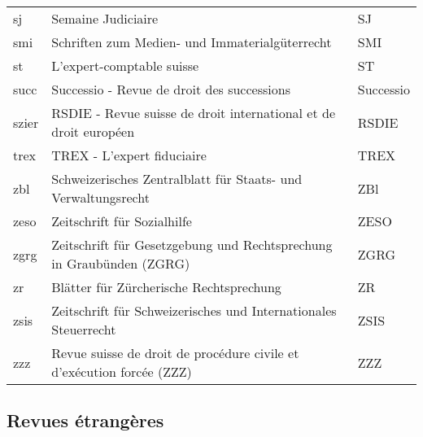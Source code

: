 \documentclass[a4paper]{ltxdockit}[2011/03/25]
\begin{document}
\begin{tabularx}{\textwidth}{@{}p{2.5cm}@{}p{9cm}@{}X@{}}
sj & Semaine Judiciaire & SJ \\ 
smi & Schriften zum Medien- und Immaterialg\"uterrecht & SMI\\
st & L'expert-comptable suisse & ST \\ 
succ & Successio - Revue de droit des successions & Successio \\ 
szier & RSDIE - Revue suisse de droit international et de droit europ\'een & RSDIE\\
trex & TREX - L'expert fiduciaire & TREX \\ 
zbl & Schweizerisches Zentralblatt für Staats- und Verwaltungsrecht & ZBl \\ 
zeso & Zeitschrift für Sozialhilfe & ZESO \\ 
zgrg & Zeitschrift f\"ur Gesetzgebung und Rechtsprechung in Graub\"unden (ZGRG) & ZGRG\\
zr & Blätter für Zürcherische Rechtsprechung & ZR \\ 
zsis & Zeitschrift für Schweizerisches und Internationales Steuerrecht & ZSIS\\
zzz & Revue suisse de droit de proc\'edure civile et d'ex\'ecution forcée (ZZZ) & ZZZ
 \\ 
\bottomrule
\end{tabularx}

\subsection{Revues étrangères}
\end{document}
